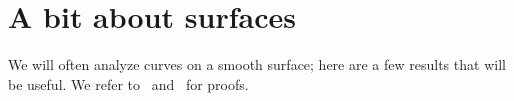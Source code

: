 % 
%
%
%

 \section{A bit about surfaces}
 We will often analyze curves  on a smooth surface; here are a few results that will be useful. We refer to~\cite[Chapter V]{Hartshorne1977}
 and~\cite[Chapter I]{Beauville} for proofs.
 
